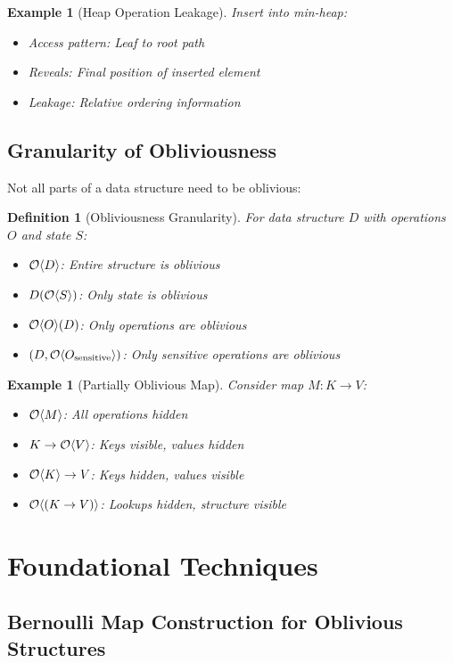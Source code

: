\documentclass[11pt,final]{article}
\newtheorem{definition}[theorem]{Definition}
\newtheorem{example}[theorem]{Example}
\begin{document}
\begin{example}[Heap Operation Leakage]
Insert into min-heap:
\begin{itemize}
    \item Access pattern: Leaf to root path
    \item Reveals: Final position of inserted element
    \item Leakage: Relative ordering information
\end{itemize}
\end{example}

\subsection{Granularity of Obliviousness}

Not all parts of a data structure need to be oblivious:

\begin{definition}[Obliviousness Granularity]
For data structure $D$ with operations $O$ and state $S$:
\begin{itemize}
    \item $\mathcal{O}\langle D \rangle$: Entire structure is oblivious
    \item $D(\mathcal{O}\langle S \rangle)$: Only state is oblivious
    \item $\mathcal{O}\langle O \rangle(D)$: Only operations are oblivious
    \item $(D, \mathcal{O}\langle O_{\text{sensitive}} \rangle)$: Only sensitive operations are oblivious
\end{itemize}
\end{definition}

\begin{example}[Partially Oblivious Map]
Consider map $M: K \to V$:
\begin{itemize}
    \item $\mathcal{O}\langle M \rangle$: All operations hidden
    \item $K \to \mathcal{O}\langle V \rangle$: Keys visible, values hidden
    \item $\mathcal{O}\langle K \rangle \to V$: Keys hidden, values visible
    \item $\mathcal{O}\langle (K \to V) \rangle$: Lookups hidden, structure visible
\end{itemize}
\end{example}

\section{Foundational Techniques}

\subsection{Bernoulli Map Construction for Oblivious Structures}
\end{document}
